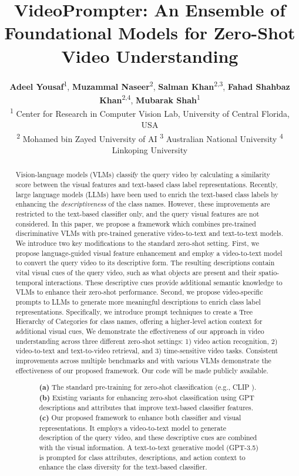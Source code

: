 \documentclass{article} \usepackage{iclr2024_conference,times}
\title{VideoPrompter: An Ensemble of Foundational Models for Zero-Shot Video Understanding}
\author{
  \textbf{Adeel Yousaf}\textsuperscript{1},
  \textbf{Muzammal Naseer}\textsuperscript{2},
  \textbf{Salman Khan}\textsuperscript{2,3},
  \textbf{Fahad Shahbaz Khan}\textsuperscript{2,4},
  \textbf{Mubarak Shah}\textsuperscript{1}
  \\
\hspace{0.9cm}\textsuperscript{1} Center for Research in Computer Vision Lab, University of Central Florida, USA\\
\textsuperscript{2} Mohamed bin Zayed University of AI \hspace{0.15cm}
\textsuperscript{3} Australian National University \hspace{0.15cm}
\textsuperscript{4} Linkoping University
}
\begin{document}
\maketitle

\begin{abstract}




Vision-language models (VLMs) classify the query video by calculating a similarity score between the visual features and text-based class label representations. Recently, large language models (LLMs) have been used to enrich the text-based class labels by enhancing the \emph{descriptiveness} of the class names. However, these improvements are restricted to the text-based classifier only, and the query visual features are not considered.
In this paper, we propose a framework which combines pre-trained discriminative VLMs with pre-trained generative video-to-text and text-to-text models.  We introduce two key modifications to the standard zero-shot setting. First, we propose language-guided visual feature enhancement and employ a video-to-text model to convert the query video to its descriptive form. The resulting descriptions contain vital visual cues of the query video, such as what objects are present and their spatio-temporal interactions. These descriptive cues provide additional semantic knowledge to VLMs to enhance their zero-shot performance. Second, we propose video-specific prompts to LLMs to generate more meaningful descriptions to enrich class label representations.  Specifically, we introduce prompt techniques to create a Tree Hierarchy of Categories for class names, offering a higher-level action context for additional visual cues, We demonstrate the effectiveness of our approach in video understanding across three different zero-shot settings: 1) video action recognition, 2) video-to-text and text-to-video retrieval, and 3) time-sensitive video tasks. Consistent improvements across multiple benchmarks and with various VLMs demonstrate the effectiveness of our proposed framework. Our code will be made publicly available.


\begin{figure}[!htb]
    \caption{\textbf{(a)} The standard pre-training for zero-shot classification (e.g., CLIP 
    \citep{radford2021learning}). \textbf{(b)} Existing variants for enhancing zero-shot classification \citep{pratt2022does,menon2022visual} using GPT descriptions and attributes that improve text-based classifier features. \textbf{(c)} Our proposed framework to enhance both classifier and visual representations. It employs a video-to-text model to generate description of the query video, and these descriptive cues are combined with the visual information. A text-to-text generative model (GPT-3.5) is prompted for class attributes, descriptions, and action context to enhance the class diversity for the text-based classifier.}\label{fig:introfig}
    \vspace{-1.5em}
\end{figure}




\end{abstract}
\end{document}
